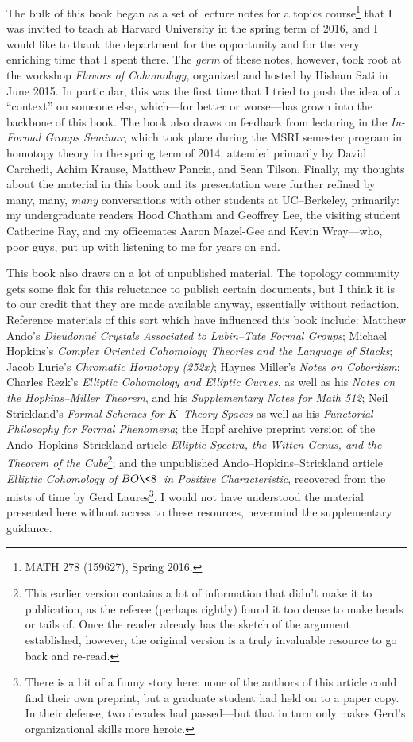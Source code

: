 The bulk of this book began as a set of lecture notes for a topics course\footnote{MATH 278 (159627), Spring 2016.} that I was invited to teach at Harvard University in the spring term of 2016, and I would like to thank the department for the opportunity and for the very enriching time that I spent there.  The \emph{germ} of these notes, however, took root at the workshop \textit{Flavors of Cohomology}, organized and hosted by Hisham Sati in June 2015.  In particular, this was the first time that I tried to push the idea of a ``context'' on someone else, which---for better or worse---has grown into the backbone of this book.  The book also draws on feedback from lecturing in the \textit{In-Formal Groups Seminar}, which took place during the MSRI semester program in homotopy theory in the spring term of 2014, attended primarily by David Carchedi, Achim Krause, Matthew Pancia, and Sean Tilson.  Finally, my thoughts about the material in this book and its presentation were further refined by many, many, \emph{many} conversations with other students at UC--Berkeley, primarily: my undergraduate readers Hood Chatham and Geoffrey Lee, the visiting student Catherine Ray, and my officemates Aaron Mazel-Gee and Kevin Wray---who, poor guys, put up with listening to me for years on end.

This book also draws on a lot of unpublished material.  The topology community gets some flak for this reluctance to publish certain documents, but I think it is to our credit that they are made available anyway, essentially without redaction.  Reference materials of this sort which have influenced this book include: Matthew Ando's \textit{Dieudonn\'e Crystals Associated to Lubin--Tate Formal Groups}; Michael Hopkins's \textit{Complex Oriented Cohomology Theories and the Language of Stacks}; Jacob Lurie's \textit{Chromatic Homotopy (252x)}; Haynes Miller's \textit{Notes on Cobordism}; Charles Rezk's \textit{Elliptic Cohomology and Elliptic Curves}, as well as his \textit{Notes on the Hopkins--Miller Theorem}, and his \textit{Supplementary Notes for Math 512}; Neil Strickland's \textit{Formal Schemes for $K$--Theory Spaces} as well as his \textit{Functorial Philosophy for Formal Phenomena}; the Hopf archive preprint version of the Ando--Hopkins--Strickland article \textit{Elliptic Spectra, the Witten Genus, and the Theorem of the Cube}\footnote{This earlier version contains a lot of information that didn't make it to publication, as the referee (perhaps rightly) found it too dense to make heads or tails of.  Once the reader already has the sketch of the argument established, however, the original version is a truly invaluable resource to go back and re-read.}; and the unpublished Ando--Hopkins--Strickland article \textit{Elliptic Cohomology of $BO\<8\>$ in Positive Characteristic}, recovered from the mists of time by Gerd Laures\footnote{There is a bit of a funny story here: none of the authors of this article could find their own preprint, but a graduate student had held on to a paper copy.  In their defense, two decades had passed---but that in turn only makes Gerd's organizational skills more heroic.}.  I would not have understood the material presented here without access to these resources, nevermind the supplementary guidance.

